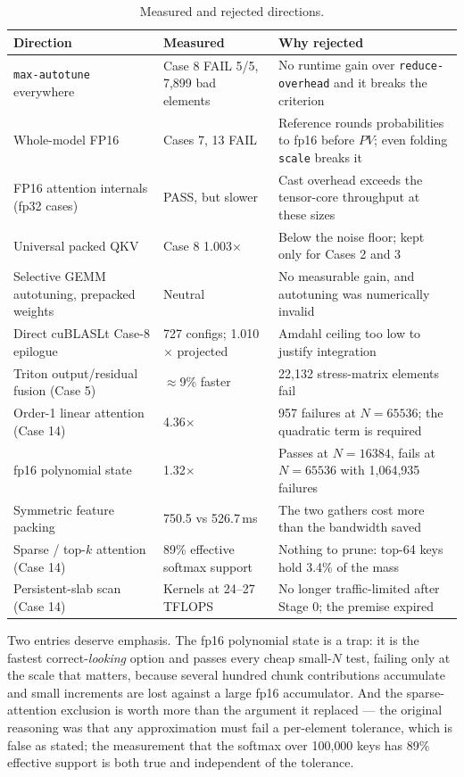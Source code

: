 \documentclass[10pt,conference,compsoc]{IEEEtran}
\begin{document}
\begin{table}[H]
\centering
\scriptsize
\begin{tabular}{p{2.35cm} p{2.2cm} p{2.6cm}}
\hline
\textbf{Direction} & \textbf{Measured} & \textbf{Why rejected} \\
\hline
\texttt{max-autotune} everywhere & Case 8 FAIL 5/5, 7{,}899 bad elements & No runtime gain over \texttt{reduce-overhead} and it breaks the criterion \\
Whole-model FP16 & Cases 7, 13 FAIL & Reference rounds probabilities to fp16 before $PV$; even folding \texttt{scale} breaks it \\
FP16 attention internals (fp32 cases) & PASS, but slower & Cast overhead exceeds the tensor-core throughput at these sizes \\
Universal packed QKV & Case 8 1.003$\times$ & Below the noise floor; kept only for Cases 2 and 3 \\
Selective GEMM autotuning, prepacked weights & Neutral & No measurable gain, and autotuning was numerically invalid \\
Direct cuBLASLt Case-8 epilogue & 727 configs; 1.010$\times$ projected & Amdahl ceiling too low to justify integration \\
Triton output/residual fusion (Case 5) & $\approx$9\% faster & 22{,}132 stress-matrix elements fail \\
Order-1 linear attention (Case 14) & 4.36$\times$ & 957 failures at $N{=}65536$; the quadratic term is required \\
fp16 polynomial state & 1.32$\times$ & Passes at $N{=}16384$, fails at $N{=}65536$ with 1{,}064{,}935 failures \\
Symmetric feature packing & 750.5 vs 526.7\,ms & The two gathers cost more than the bandwidth saved \\
Sparse / top-$k$ attention (Case 14) & 89\% effective softmax support & Nothing to prune: top-64 keys hold 3.4\% of the mass \\
Persistent-slab scan (Case 14) & Kernels at 24--27 TFLOPS & No longer traffic-limited after Stage 0; the premise expired \\
\hline
\end{tabular}
\vspace{6pt}
\caption{Measured and rejected directions.}
\label{tab:negative}
\end{table}

Two entries deserve emphasis. The fp16 polynomial state is a trap: it is the fastest correct-\emph{looking} option and passes every cheap small-$N$ test, failing only at the scale that matters, because several hundred chunk contributions accumulate and small increments are lost against a large fp16 accumulator. And the sparse-attention exclusion is worth more than the argument it replaced --- the original reasoning was that any approximation must fail a per-element tolerance, which is false as stated; the measurement that the softmax over 100{,}000 keys has 89\% effective support is both true and independent of the tolerance.
\end{document}
